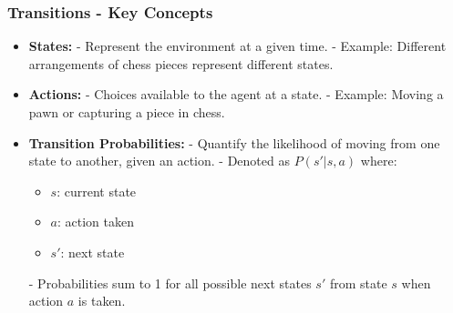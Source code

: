 \documentclass[aspectratio=169]{beamer}
\begin{document}
\begin{frame}[fragile]
    \frametitle{Transitions - Key Concepts}
    \begin{itemize}
        \item \textbf{States:} 
            - Represent the environment at a given time. 
            - Example: Different arrangements of chess pieces represent different states.

        \item \textbf{Actions:} 
            - Choices available to the agent at a state. 
            - Example: Moving a pawn or capturing a piece in chess.

        \item \textbf{Transition Probabilities:} 
            - Quantify the likelihood of moving from one state to another, given an action.
            - Denoted as \( P(s'|s, a) \) where:
                \begin{itemize}
                    \item \( s \): current state
                    \item \( a \): action taken
                    \item \( s' \): next state
                \end{itemize}
            - Probabilities sum to 1 for all possible next states \( s' \) from state \( s \) when action \( a \) is taken.
    \end{itemize}
\end{frame}
\end{document}
